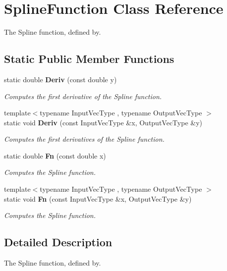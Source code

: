 \section{Spline\+Function Class Reference}
\label{classmlpack_1_1ann_1_1SplineFunction}


The Spline function, defined by.  


\subsection*{Static Public Member Functions}
\begin{DoxyCompactItemize}
\item 
static double \textbf{ Deriv} (const double y)
\begin{DoxyCompactList}\small\item\em Computes the first derivative of the Spline function. \end{DoxyCompactList}\item 
{\footnotesize template$<$typename Input\+Vec\+Type , typename Output\+Vec\+Type $>$ }\\static void \textbf{ Deriv} (const Input\+Vec\+Type \&x, Output\+Vec\+Type \&y)
\begin{DoxyCompactList}\small\item\em Computes the first derivatives of the Spline function. \end{DoxyCompactList}\item 
static double \textbf{ Fn} (const double x)
\begin{DoxyCompactList}\small\item\em Computes the Spline function. \end{DoxyCompactList}\item 
{\footnotesize template$<$typename Input\+Vec\+Type , typename Output\+Vec\+Type $>$ }\\static void \textbf{ Fn} (const Input\+Vec\+Type \&x, Output\+Vec\+Type \&y)
\begin{DoxyCompactList}\small\item\em Computes the Spline function. \end{DoxyCompactList}\end{DoxyCompactItemize}


\subsection{Detailed Description}
The Spline function, defined by. 

